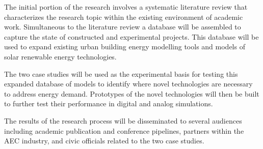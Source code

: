 \begin{titlepage}
The initial portion of the research involves a systematic literature review that characterizes the research topic within the existing environment of academic work. Simultaneous to the literature review a database will be assembled to capture the state of constructed and experimental projects. This database will be used to expand existing urban building energy modelling tools and models of solar renewable energy technologies.

The two case studies will be used as the experimental basis for testing this expanded database of models to identify where novel technologies are necessary to address energy demand. Prototypes of the novel technologies will then be built to further test their performance in digital and analog simulations. 

The results of the research process will be disseminated to several audiences including academic publication and conference pipelines, partners within the AEC industry, and civic officials related to the two case studies. 






\end{titlepage}



\title{}
\author{}



\tableofcontents
